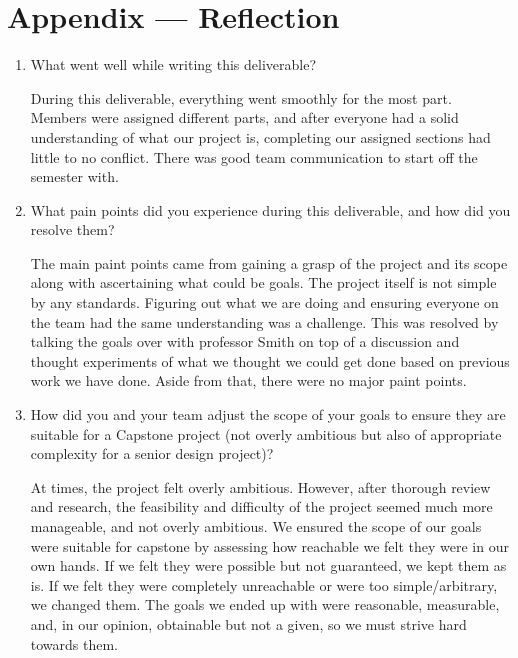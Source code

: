 \documentclass{article}
\begin{document}

\newpage{}

\section*{Appendix --- Reflection}




\begin{enumerate}
    \item What went well while writing this deliverable? 
    
    During this deliverable, everything went smoothly for the most part. 
    Members were assigned different parts, and after everyone had a solid 
    understanding of what our project is, completing our assigned sections 
    had little to no conflict. There was good team communication to start 
    off the semester with.
    
    \item What pain points did you experience during this deliverable, and how
    did you resolve them?

    The main paint points came from gaining a grasp of the project and its
    scope along with ascertaining what could be goals. The project itself is 
    not simple  by any standards. Figuring out what we are doing and ensuring 
    everyone on the team had the same understanding was a challenge. This was 
    resolved by talking the goals over with professor Smith on top of a 
    discussion and thought  experiments of what we thought we could get done
    based on previous work we have done. Aside from that, there were no major 
    paint points.
    
    \item How did you and your team adjust the scope of your goals to ensure
    they are suitable for a Capstone project (not overly ambitious but also of
    appropriate complexity for a senior design project)?

    At times, the project felt overly ambitious. However, after thorough review
    and research, the feasibility and difficulty of the project seemed much more
    manageable, and not overly ambitious. We ensured the scope of our goals were
    suitable for capstone by assessing how reachable we felt they were in our 
    own hands. If we felt they were possible but not guaranteed, we kept them as 
    is. If we felt they were completely unreachable or were too simple/arbitrary, 
    we changed them. The goals we ended up with were reasonable, measurable, and, 
    in our opinion, obtainable but not a given, so we must strive hard towards
    them. 
\end{enumerate}  
\end{document}
